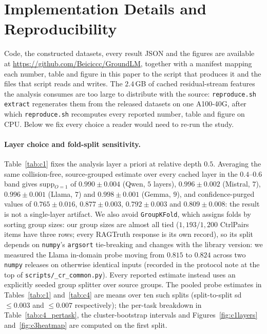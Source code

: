 \section{Implementation Details and Reproducibility}
\label{app:impl}
Code, the constructed datasets, every result JSON and the figures are available at
\url{https://github.com/Beiciccc/GroundLM}, together with a manifest mapping each
number, table and figure in this paper to the script that produces it and the files
that script reads and writes. The $2.4$\,GB of cached residual-stream features the
analysis consumes are too large to distribute with the source:
\texttt{reproduce.sh extract} regenerates them from the released
datasets on one A100-40G, after which \texttt{reproduce.sh} recomputes every reported
number, table and figure on CPU. Below we fix every choice a reader would need to
re-run the study.

\paragraph{Layer choice and fold-split sensitivity.}
Table~\ref{tab:c1} fixes the analysis layer a priori at relative depth $0.5$. Averaging
the same collision-free, source-grouped estimate over every cached layer in the
$0.4$--$0.6$ band gives supp$_{O=1}$ of $0.990{\pm}0.004$ (Qwen, $5$ layers),
$0.996{\pm}0.002$ (Mistral, $7$), $0.996{\pm}0.001$ (Llama, $7$) and
$0.998{\pm}0.001$ (Gemma, $9$), and confidence-purged values of $0.765{\pm}0.016$,
$0.877{\pm}0.003$, $0.792{\pm}0.003$ and $0.809{\pm}0.008$: the result is not a
single-layer artifact. We also avoid \texttt{GroupKFold}, which assigns folds by sorting
group sizes: our group sizes are almost all tied ($1{,}193/1{,}200$ CtrlPairs items have three
rows; every RAGTruth response is its own record), so its split depends on
\texttt{numpy}'s \texttt{argsort} tie-breaking and changes with the library version: we
measured the Llama in-domain probe moving from $0.815$ to $0.824$ across two
\texttt{numpy} releases on otherwise identical inputs (recorded in the protocol note at
the top of \texttt{scripts/\_cr\_common.py}). Every reported estimate instead uses an explicitly seeded group splitter over source
groups. The pooled probe estimates in Tables~\ref{tab:c1} and~\ref{tab:c4} are means
over ten such splits (split-to-split sd $\le0.003$ and $\le0.007$ respectively); the
per-task breakdown in Table~\ref{tab:c4_pertask}, the cluster-bootstrap intervals and
Figures~\ref{fig:c1layers} and~\ref{fig:c3heatmap} are computed on the first split.

